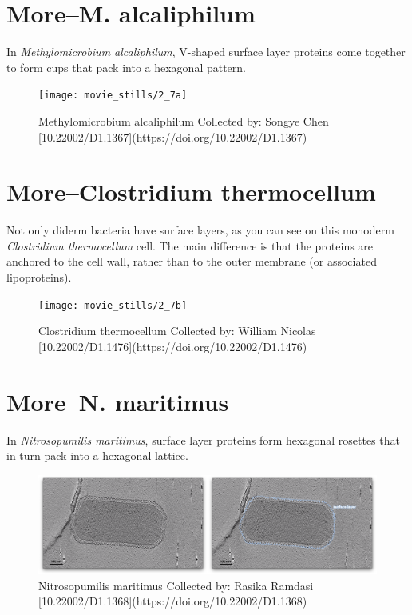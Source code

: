 \documentclass[]{tufte-book}
\begin{document}
\section{More--M. alcaliphilum}\label{morem.-alcaliphilum}

In \emph{Methylomicrobium alcaliphilum}, V-shaped surface layer proteins
come together to form cups that pack into a hexagonal pattern.

\begin{figure}
\texttt{[image: movie\_stills/2\_7a]} \caption[Methylomicrobium alcaliphilum Collected by]{Methylomicrobium alcaliphilum Collected by: Songye Chen [10.22002/D1.1367](https://doi.org/10.22002/D1.1367)}\label{fig:unnamed-chunk-38}
\end{figure}

\hypertarget{moreclostridium-thermocellum}{\section{More--Clostridium
thermocellum}\label{moreclostridium-thermocellum}}

Not only diderm bacteria have surface layers, as you can see on this
monoderm \emph{Clostridium thermocellum} cell. The main difference is
that the proteins are anchored to the cell wall, rather than to the
outer membrane (or associated lipoproteins).

\begin{figure}
\texttt{[image: movie\_stills/2\_7b]} \caption[Clostridium thermocellum Collected by]{Clostridium thermocellum Collected by: William Nicolas [10.22002/D1.1476](https://doi.org/10.22002/D1.1476)}\label{fig:unnamed-chunk-39}
\end{figure}

\section{More--N. maritimus}\label{moren.-maritimus}

In \emph{Nitrosopumilis maritimus}, surface layer proteins form
hexagonal rosettes that in turn pack into a hexagonal lattice.

\begin{figure}
\includegraphics{movie_stills/2_7c} \caption[Nitrosopumilis maritimus Collected by]{Nitrosopumilis maritimus Collected by: Rasika Ramdasi [10.22002/D1.1368](https://doi.org/10.22002/D1.1368)}\label{fig:unnamed-chunk-40}
\end{figure}
\end{document}
